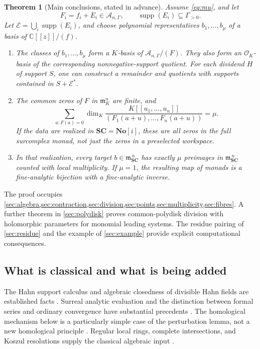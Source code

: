 \documentclass[11pt,letterpaper]{article}
\newtheorem{theorem}{Theorem}[section]
\theoremstyle{definition}
\theoremstyle{remark}
\newcommand{\No}{\mathbf{No}}
\newcommand{\SC}{\mathbf{SC}}
\newcommand{\C}{\mathbb C}
\newcommand{\A}{\mathscr A}
\newcommand{\OO}{\mathcal O}
\newcommand{\mm}{\mathfrak m}
\newcommand{\EE}{\mathcal E}
\newcommand{\supp}{\operatorname{supp}}
\numberwithin{equation}{section}
\begin{document}
\begin{theorem}[Main conclusions, stated in advance]\label{thm:main}
Assume \eqref{eq:mu}, and let
\[
 F_i=f_i+E_i\in\A_{n,\Gamma},\qquad
 \supp(E_i)\subseteq\Gamma_{>0}.
\]
Let $\EE=\bigcup_i\supp(E_i)$, and choose polynomial representatives $b_1,\ldots,b_\mu$ of a basis of $\C[[z]]/(f)$.
\begin{enumerate}
\item The classes of $b_1,\ldots,b_\mu$ form a $K$-basis of $\A_{n,\Gamma}/(F)$. They also form an $\OO_K$-basis of the corresponding nonnegative-support quotient. For each dividend $H$ of support $S$, one can construct a remainder and quotients with supports contained in $S+\EE^*$.
\item The common zeros of $F$ in $\mm_K^n$ are finite, and
\[
 \sum_{a:F(a)=0}\dim_K
 \frac{K[[u_1,\ldots,u_n]]}{(F_1(a+u),\ldots,F_n(a+u))}=\mu.
\]
If the data are realized in $\SC=\No[i]$, these are all zeros in the full surcomplex monad, not just the zeros in a preselected workspace.
\item In that realization, every target $b\in\mm_{\SC}^{\,n}$ has exactly $\mu$ preimages in $\mm_{\SC}^{\,n}$ counted with local multiplicity. If $\mu=1$, the resulting map of monads is a fine-analytic bijection with a fine-analytic inverse.
\end{enumerate}
\end{theorem}
The proof occupies \cref{sec:algebra,sec:contraction,sec:division,sec:points,sec:multiplicity,sec:fibres}. A further theorem in \cref{sec:polydisk} proves common-polydisk division with holomorphic parameters for monomial leading systems. The residue pairing of \cref{sec:residue} and the example of \cref{sec:example} provide explicit computational consequences.

\subsection{What is classical and what is being added}
The Hahn support calculus and algebraic closedness of divisible Hahn fields are established facts \cite{Neumann,Poonen}. Surreal analytic evaluation and the distinction between formal series and ordinary convergence have substantial precedents \cite{Alling,vdDE,BM}. The homological mechanism below is a particularly simple case of the perturbation lemma, not a new homological principle \cite{Crainic}. Regular local rings, complete intersections, and Koszul resolutions supply the classical algebraic input \cite{StacksCM,StacksRegular,StacksKoszul}.
\end{document}
